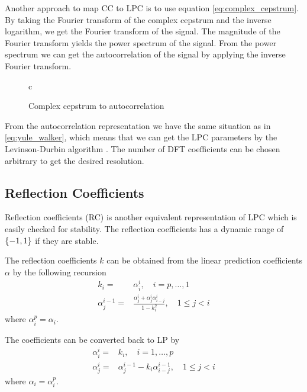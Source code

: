 Another approach to map CC to LPC is to use equation \eqref{eq:complex_cepstrum}. By taking the Fourier transform of the complex cepstrum and the inverse logarithm, we get the Fourier transform of the signal. The magnitude of the Fourier transform yields the power spectrum of the signal. From the power spectrum we can get the autocorrelation of the signal by applying the inverse Fourier transform.
\begin{figure}[htbp]
  \centering
  \begin{tabular}[h]{c}
  \end{tabular}
  \caption{Complex cepstrum to autocorrelation}
  \label{fig:cc2ar}
\end{figure}
From the autocorrelation representation we have the same situation as in \eqref{eq:yule_walker}, which means that we can get the LPC parameters by the Levinson-Durbin algorithm \cite{cybenko80}. The number of DFT coefficients can be chosen arbitrary to get the desired resolution.

\subsection{Reflection Coefficients} %
\label{sub:reflection_coefficients}
Reflection coefficients (RC) is another equivalent representation of LPC which is easily checked for stability. The reflection coefficients has a dynamic range of $\lbrace-1,1\rbrace$ if they are stable. 

The reflection coefficients $k$ can be obtained from the linear prediction coefficients $\alpha$ by the following recursion
\begin{equation}
	\label{eq:ar2rf}
	\begin{split}
		k_i = & \alpha_i^i, \quad i=p,\dotsc,1 \\
		\alpha_j^{i-1} = & \frac{\alpha_j^i+\alpha_j^i \alpha_{i-j}^i}{1-k_i^2}, \quad 1\leq j<i
	\end{split}
\end{equation}
where $\alpha_i^p=\alpha_i$.

The coefficients can be converted back to LP by \cite{taletek}
\begin{equation}
	\label{eq:rf2ar}
	\begin{split}
		\alpha_i^i = & k_i, \quad i=1,\dotsc,p \\
		\alpha_j^i = & \alpha_j^{i-1}-k_i \alpha_{i-j}^{i-1}, \quad 1\leq j<i
	\end{split}
\end{equation}
where $\alpha_i=\alpha_i^p$.

